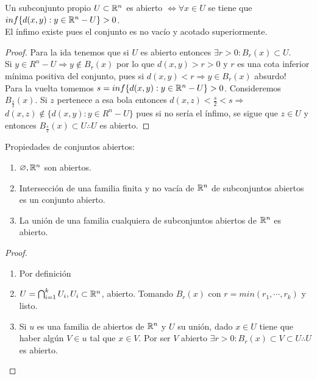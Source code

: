 \begin{prop}
  Un subconjunto propio $U \subset \mathbb{R}^n$ es abierto $\iff \forall x \in U$ se tiene que $inf\{d(x, y) : y \in \mathbb{R}^n - U\} > 0$. \\
  El ínfimo existe pues el conjunto es no vacío y acotado superiormente.
  \begin{proof}
    Para la ida tenemos que si $U$ es abierto entonces $\exists r > 0 : B_r(x) \subset U$. \\
    Si $y \in R^n - U \Rightarrow y \notin B_r(x)$ por lo que $d(x, y) > r > 0$ y $r$ es una cota inferior mínima positiva del conjunto, pues si $d(x,y) < r \Rightarrow y \in B_r(x)$ absurdo! \\

    Para la vuelta tomemos $s = inf\{ d(x,y) : y \in \mathbb{R}^n - U \} > 0$. Consideremos $B_{\frac{s}{2}}(x)$. Si $z$ pertenece a esa bola entonces $d(x, z) < \frac{s}{2} < s \Rightarrow$ \\
    $d(x, z) \notin \{ d(x,y) : y \in R^n - U \}$ pues si no sería el ínfimo, se sigue que $z \in U$ y entonces $B_{\frac{s}{2}}(x) \subset U \therefore U$ es abierto.
  \end{proof}
\end{prop}

\begin{prop}
  Propiedades de conjuntos abiertos:
  \begin{enumerate}
    \item $\varnothing, \mathbb{R}^n$ son abiertos.
    \item Intersección de una familia finita y no vacía de $\mathbb{R}^n$ de subconjuntos abiertos es un conjunto abierto.
    \item La unión de una familia cualquiera de subconjuntos abiertos de $\mathbb{R}^n$ es abierto.
  \end{enumerate}
  \begin{proof}
    \begin{enumerate}
      \item Por definición
      \item $U = \bigcap_{i = 1}^k U_i, U_i \subset \mathbb{R}^n$, abierto. Tomando $B_r(x)$ con $r = min(r_1, \cdots, r_k)$ y listo.
      \item Si $u$ es una familia de abiertos de $\mathbb{R}^n$ y $U$ su unión, dado $x \in U$ tiene que haber algún $V \in u$ tal que $x \in V$. Por ser $V$ abierto $\exists r > 0 : B_r(x) \subset V \subset U \therefore U$ es abierto.
    \end{enumerate}
  \end{proof}
\end{prop}

